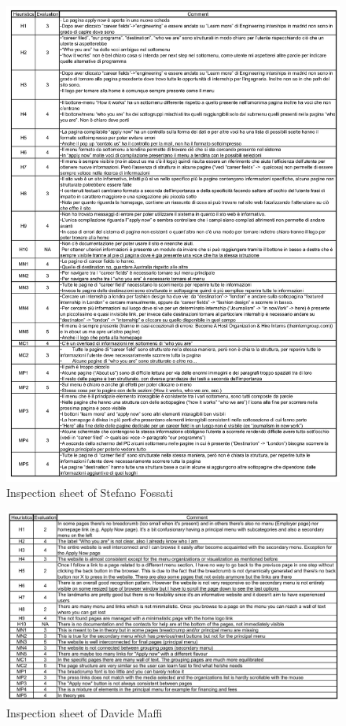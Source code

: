 \documentclass[11pt, letterpaper]{article}
\begin{document}
    \begin{figure}[H]
        \centering
        \includegraphics[width=18cm]{images/annex/SF_inspection.png}
        \caption{Inspection sheet of Stefano Fossati}
    \end{figure}
    \begin{figure}[H]
        \centering
        \includegraphics[width=18cm]{images/annex/DM_inspection.png}
        \caption{Inspection sheet of Davide Maffi}
    \end{figure}
\end{document}
